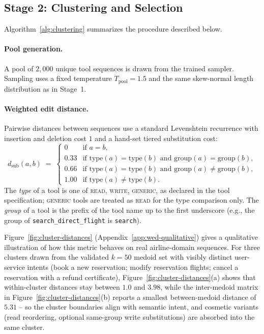 \subsection{Stage 2: Clustering and Selection}
\label{app:clustering}

Algorithm~\ref{alg:clustering} summarizes the procedure described below.

\paragraph{Pool generation.}
A pool of $2{,}000$ unique tool sequences is drawn from the trained sampler. Sampling uses a fixed temperature $T_{\text{pool}} = 1.5$ and the same skew-normal length distribution as in Stage~1.

\paragraph{Weighted edit distance.}
Pairwise distances between sequences use a standard Levenshtein recurrence with insertion and deletion cost $1$ and a hand-set tiered substitution cost:
\[
  d_{\text{sub}}(a, b) \;=\;
  \begin{cases}
    0 & \text{if } a = b, \\
    0.33 & \text{if } \text{type}(a) = \text{type}(b) \text{ and } \text{group}(a) = \text{group}(b), \\
    0.66 & \text{if } \text{type}(a) = \text{type}(b) \text{ and } \text{group}(a) \neq \text{group}(b), \\
    1.00 & \text{if } \text{type}(a) \neq \text{type}(b).
  \end{cases}
\]
The \emph{type} of a tool is one of \textsc{read}, \textsc{write}, \textsc{generic}, as declared in the tool specification; \textsc{generic} tools are treated as \textsc{read} for the type comparison only. The \emph{group} of a tool is the prefix of the tool name up to the first underscore (e.g., the group of \texttt{search\_direct\_flight} is \texttt{search}). 

Figure~\ref{fig:cluster-distances} (Appendix~\ref{app:wed-qualitative}) gives a qualitative illustration of how this metric behaves on real airline-domain sequences. For three clusters drawn from the validated $k=50$ medoid set with visibly distinct user-service intents (book a new reservation; modify reservation flights; cancel a reservation with a refund certificate), Figure~\ref{fig:cluster-distances}(a) shows that within-cluster distances stay between $1.0$ and $3.98$, while the inter-medoid matrix in Figure~\ref{fig:cluster-distances}(b) reports a smallest between-medoid distance of $5.31$ -- so the cluster boundaries align with semantic intent, and cosmetic variants (read reordering, optional same-group write substitutions) are absorbed into the same cluster.

